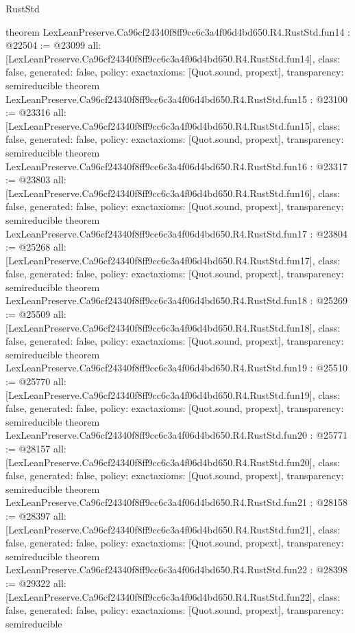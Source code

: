 \begin{lexlean}{RustStd}
\begin{coremodule}
{}
theorem LexLeanPreserve.Ca96cf24340f8ff9cc6c3a4f06d4bd650.R4.RustStd.fun14 : @22504 := @23099 {
  all: [LexLeanPreserve.Ca96cf24340f8ff9cc6c3a4f06d4bd650.R4.RustStd.fun14],
  class: false,
  generated: false,
  policy: exact{axioms: [Quot.sound, propext]},
  transparency: semireducible
}
theorem LexLeanPreserve.Ca96cf24340f8ff9cc6c3a4f06d4bd650.R4.RustStd.fun15 : @23100 := @23316 {
  all: [LexLeanPreserve.Ca96cf24340f8ff9cc6c3a4f06d4bd650.R4.RustStd.fun15],
  class: false,
  generated: false,
  policy: exact{axioms: [Quot.sound, propext]},
  transparency: semireducible
}
theorem LexLeanPreserve.Ca96cf24340f8ff9cc6c3a4f06d4bd650.R4.RustStd.fun16 : @23317 := @23803 {
  all: [LexLeanPreserve.Ca96cf24340f8ff9cc6c3a4f06d4bd650.R4.RustStd.fun16],
  class: false,
  generated: false,
  policy: exact{axioms: [Quot.sound, propext]},
  transparency: semireducible
}
theorem LexLeanPreserve.Ca96cf24340f8ff9cc6c3a4f06d4bd650.R4.RustStd.fun17 : @23804 := @25268 {
  all: [LexLeanPreserve.Ca96cf24340f8ff9cc6c3a4f06d4bd650.R4.RustStd.fun17],
  class: false,
  generated: false,
  policy: exact{axioms: [Quot.sound, propext]},
  transparency: semireducible
}
theorem LexLeanPreserve.Ca96cf24340f8ff9cc6c3a4f06d4bd650.R4.RustStd.fun18 : @25269 := @25509 {
  all: [LexLeanPreserve.Ca96cf24340f8ff9cc6c3a4f06d4bd650.R4.RustStd.fun18],
  class: false,
  generated: false,
  policy: exact{axioms: [Quot.sound, propext]},
  transparency: semireducible
}
theorem LexLeanPreserve.Ca96cf24340f8ff9cc6c3a4f06d4bd650.R4.RustStd.fun19 : @25510 := @25770 {
  all: [LexLeanPreserve.Ca96cf24340f8ff9cc6c3a4f06d4bd650.R4.RustStd.fun19],
  class: false,
  generated: false,
  policy: exact{axioms: [Quot.sound, propext]},
  transparency: semireducible
}
theorem LexLeanPreserve.Ca96cf24340f8ff9cc6c3a4f06d4bd650.R4.RustStd.fun20 : @25771 := @28157 {
  all: [LexLeanPreserve.Ca96cf24340f8ff9cc6c3a4f06d4bd650.R4.RustStd.fun20],
  class: false,
  generated: false,
  policy: exact{axioms: [Quot.sound, propext]},
  transparency: semireducible
}
theorem LexLeanPreserve.Ca96cf24340f8ff9cc6c3a4f06d4bd650.R4.RustStd.fun21 : @28158 := @28397 {
  all: [LexLeanPreserve.Ca96cf24340f8ff9cc6c3a4f06d4bd650.R4.RustStd.fun21],
  class: false,
  generated: false,
  policy: exact{axioms: [Quot.sound, propext]},
  transparency: semireducible
}
theorem LexLeanPreserve.Ca96cf24340f8ff9cc6c3a4f06d4bd650.R4.RustStd.fun22 : @28398 := @29322 {
  all: [LexLeanPreserve.Ca96cf24340f8ff9cc6c3a4f06d4bd650.R4.RustStd.fun22],
  class: false,
  generated: false,
  policy: exact{axioms: [Quot.sound, propext]},
  transparency: semireducible
}
\end{coremodule}
\end{lexlean}
